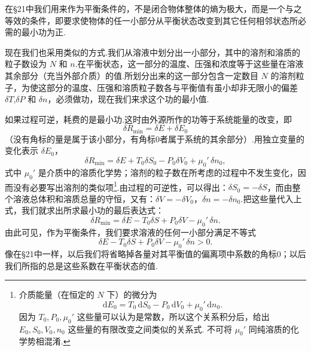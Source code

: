 在§21中我们用来作为平衡条件的，不是闭合物体整体的熵为极大，而是一个与之等效的条件，即要求使物体的任一小部分从平衡状态改变到其它任何相邻状态所必需的最小功为正.

现在我们也采用类似的方式.我们从溶液中划分出一小部分，其中的溶剂和溶质的粒子数设为 $N$ 和 $n$.在平衡状态，这一部分的温度、压强和浓度等于这些量在溶液其余部分（充当外部介质）的值.所划分出来的这一部分包含一定数目 $N$ 的溶剂粒子，为使这部分的温度、压强和溶质粒子数各与平衡值有虽小却非无限小的偏差 $\delta T$,$\delta P$ 和 $\delta n$，必须做功，现在我们来求这个功的最小值.

如果过程可逆，耗费的是最小功.这时由外源所作的功等于系统能量的改变，即
\begin{equation*}
  \delta R_{\min}=\delta E+\delta E_0
\end{equation*}
（没有角标的量是属于该小部分，有角标0者属于系统的其余部分）.用独立变量的变化表示 $\delta E_0$，
\begin{equation*}
  \delta R_{\min}=\delta E+T_0\delta S_0-P_0\delta V_0+\mu_0'\,\delta n_0,
\end{equation*}
式中 $\mu_0'$ 是介质中的溶质化学势；溶剂的粒子数在所考虑的过程中不发生变化，因而没有必要写出溶剂的类似项\footnote{介质能量（在恒定的 $N$ 下）的微分为
\begin{equation*}
  \mathrm{d}E_0=T_0\,\mathrm{d}S_0-P_0\,\mathrm{d}V_0+\mu_0'\,\mathrm{d}n_0.
\end{equation*}
因为 $T_0,P_0,\mu_0'$ 这些量可以认为是常数，所以这个关系积分后，给出 $E_0,S_0,V_0,n_0$ 这些量的有限改变之间类似的关系式.
不可将 $\mu_0'$ 同纯溶质的化学势相混淆.}.由过程的可逆性，可以得出：$\delta S_0=-\delta S$，而由整个溶液总体积和溶质总量的守恒，又有：$\delta V=-\delta V_0$，$\delta n=-\delta n_0$.把这些量代入上式，我们就求出所求最小功的最后表达式：
\begin{equation}
  \delta R_{\min}=\delta E-T_0\delta S+P_0\delta V-\mu_0'\,\delta n.
\end{equation}
由此可见，作为平衡条件，我们要求溶液的任何一小部分满足不等式
\begin{equation}
  \delta E-T_0\delta S+P_0\delta V-\mu_0'\,\delta n>0.
\end{equation}
像在§21中一样，以后我们将省略掉各量对其平衡值的偏离项中系数的角标0；以后我们所指的总是这些系数在平衡状态的值.

